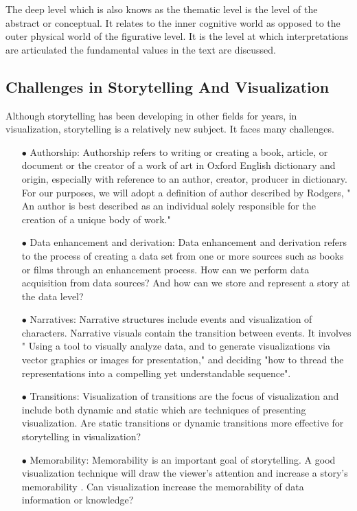 \documentclass{egpubl}
\begin{document}
The deep level which is also knows as the thematic level is the level of the abstract or conceptual. It relates to the inner cognitive world as opposed to the outer physical world of the figurative level. It is the level at which interpretations are articulated the fundamental values in the text are discussed.

\subsection{Challenges in Storytelling And Visualization}
Although storytelling has been developing in other fields for years, in visualization, storytelling is a relatively new subject. It faces many challenges.

\begin{enumerate}
	\item[$\bullet$] Authorship: Authorship refers to writing or creating a book, article, or document or the creator of a work of art in Oxford English dictionary\cite{authoship2} and origin, especially with reference to an author, creator, producer in dictionary\cite{authoship1}. For our purposes, we will adopt a definition of author described by Rodgers\cite{rodgers2011}, " An author is best described as an individual solely responsible for the creation of a unique body of work."
	\item[$\bullet$] Data enhancement and derivation: Data enhancement and derivation refers to the process of creating a data set from one or more sources such as books or films through an enhancement process. How can we perform data acquisition from data sources? And how can we store and represent a story at the data level?
	\item[$\bullet$] Narratives: Narrative structures include events and visualization of characters. Narrative visuals contain the transition between events. It involves " Using a tool to visually analyze data, and to generate visualizations via vector graphics or images for presentation," and deciding "how to thread the representations into a compelling yet understandable sequence"\cite{hullman2013deeper}.
	
	\item[$\bullet$] Transitions: Visualization of transitions are the focus of visualization and include both dynamic and static which are techniques of presenting visualization. Are static transitions or dynamic transitions more effective for storytelling in visualization?
	
	\item[$\bullet$]Memorability: Memorability is an important goal of storytelling. A good visualization technique will draw the viewer's attention and increase a story's memorability \cite{bateman}. Can visualization increase the memorability of data information or knowledge?
	

\end{enumerate}
\end{document}
